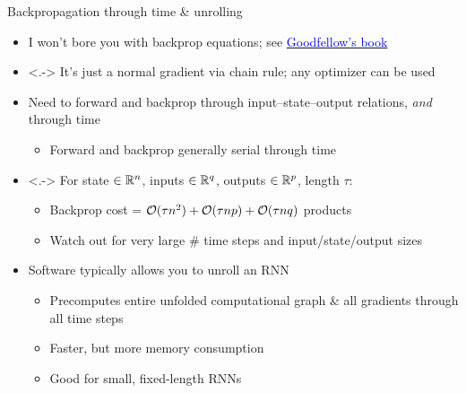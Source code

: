 \begin{frame}{Backpropagation through time \& unrolling}
    \begin{itemize}
        \item<+-> I won't bore you with backprop equations; see \href{http://www.deeplearningbook.org}{\textcolor{blue}{Goodfellow's book}}
        \item<.-> It's just a normal gradient via chain rule; any optimizer can be used
        \item<+-> Need to forward and backprop through input--state--output relations, \emph{and} through time
        \begin{itemize}
            \item Forward and backprop generally serial through time
        \end{itemize}
        \item<.-> For state $\in \mathbb{R}^n$, inputs $\in \mathbb{R}^q$, outputs $\in \mathbb{R}^p$, length $\tau$:
        \begin{itemize}
            \item Backprop cost = $\mathcal{O}(\tau n^2) + \mathcal{O}(\tau n p) + \mathcal{O}(\tau n q)$ products
            \item Watch out for very large \# time steps and input/state/output sizes
        \end{itemize}
        \item<+-> Software typically allows you to \alert{unroll} an RNN
        \begin{itemize}
            \item Precomputes entire unfolded computational graph \& all gradients through all time steps
            \item Faster, but more memory consumption
            \item Good for small, fixed-length RNNs
        \end{itemize}
    \end{itemize}
\end{frame}

